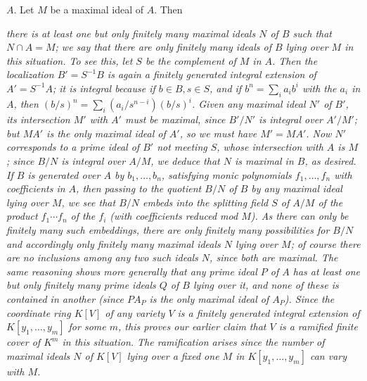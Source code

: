 \documentclass[10pt]{article}
\begin{document}
$A$. Let $M$ be a maximal ideal of $A$. Then {\sl there is at least one
  but only finitely many maximal ideals $N$ of $B$ such that $N\cap A =
  M$; we say that there are only finitely many ideals of $B$ {\sl lying
    over} $M$ in this situation. To see this, let $S$ be the complement
  of $M$ in $A$. Then the localization $B'=S^{-1}B$ is again a finitely
  generated integral extension of $A'=S^{-1}A$; it is integral because
  if $b\in B,s\in S$, and if $b^n = \sum_i a_i b^i$ with the $a_i$ in
  $A$, then $(b/s)^n = \sum_i (a_i /s^{n-i}) (b/s)^i$. Given any maximal
  ideal $N'$ of $B'$, its intersection $M'$ with $A'$ must be maximal,
  since $B'/N'$ is integral over $A'/M'$; but $MA'$ is the only maximal
  ideal of $A'$, so we must have $M' = MA'$. Now $N'$ corresponds to a
  prime ideal of $B'$ not meeting $S$, whose intersection with $A$ is
  $M$; since $B/N$ is integral over $A/M$, we deduce that $N$ is maximal
  in $B$, as desired. If $B$ is generated over $A$ by $b_1,\ldots,b_n$,
  satisfying monic polynomials $f_1,\ldots,f_n$ with coefficients in
  $A$, then passing to the quotient $B/N$ of $B$ by any maximal ideal
  lying over $M$, we see that $B/N$ embeds into the splitting field $S$
  of $A/M$ of the product $f_1\cdots f_n$ of the $f_i$ (with
  coefficients reduced mod $M$). As there can only be finitely many such
  embeddings, there are only finitely many possibilities for $B/N$ and
  accordingly only finitely many maximal ideals $N$ lying over $M$; of
  course there are no inclusions among any two such ideals $N$, since
  both are maximal. The same reasoning shows more generally that {\sl
    any prime ideal $P$ of $A$ has at least one but only finitely many
    prime ideals $Q$ of $B$ lying over it, and none of these is
    contained in another} (since $PA_P$ is the only maximal ideal of
  $A_P$). Since the coordinate ring $K[V]$ of any variety $V$ is a
  finitely generated integral extension of $K[y_1,\ldots,y_m]$ for some
  $m$, this proves our earlier claim that $V$ is a ramified finite cover
  of $K^m$ in this situation. The ramification arises since the number
  of maximal ideals $N$ of $K[V]$ lying over a fixed one $M$ in
  $K[y_1,\ldots,y_m]$ can vary with $M$.

}
\end{document}
